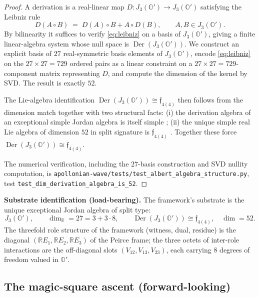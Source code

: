 \documentclass[11pt,a4paper]{article}
\theoremstyle{plain}
\theoremstyle{definition}
\theoremstyle{remark}
\numberwithin{equation}{section}
\providecommand{\R}{\mathbb{R}}
\providecommand{\Os}{\mathbb{O}'}
\providecommand{\fk}[1]{\mathfrak{#1}}
\DeclareMathOperator{\Der}{Der}
\begin{document}
\begin{proof}
A derivation is a real-linear map $D: J_3(\Os) \to J_3(\Os)$
satisfying the Leibniz rule
\begin{equation}
  D(A \circ B) \;=\; D(A) \circ B + A \circ D(B), \qquad A, B \in J_3(\Os).
  \label{eq:leibniz}
\end{equation}
By bilinearity it suffices to verify \eqref{eq:leibniz} on a basis
of $J_3(\Os)$, giving a finite linear-algebra system whose null
space is $\Der(J_3(\Os))$.  We construct an explicit basis of $27$
real-symmetric basis elements of $J_3(\Os)$, encode
\eqref{eq:leibniz} on the $27 \times 27 = 729$ ordered pairs as a
linear constraint on a $27 \times 27 = 729$-component matrix
representing $D$, and compute the dimension of the kernel by
SVD.  The result is exactly $52$.

\smallskip
The Lie-algebra identification $\Der(J_3(\Os)) \cong
\fk{f}_{4(4)}$ then follows from the dimension match together with
two structural facts: (i) the derivation algebra of an
exceptional simple Jordan algebra is itself simple
\cite{jacobson1968}; (ii) the unique simple real Lie algebra of
dimension $52$ in split signature is $\fk{f}_{4(4)}$
\cite{cartan1894,helgason2001}.  Together these force
$\Der(J_3(\Os)) \cong \fk{f}_{4(4)}$.

\smallskip
The numerical verification, including the $27$-basis construction
and SVD nullity computation, is
\texttt{apollonian-wave/tests/test\_albert\_algebra\_structure.py},
test \texttt{test\_dim\_derivation\_algebra\_is\_52}.
\end{proof}

\begin{keyresultbox}
\noindent\textbf{Substrate identification (load-bearing).}
The framework's substrate is the unique exceptional Jordan algebra
of split type:
\[
  J_3(\Os), \qquad
  \dim_\R = 27 = 3 + 3 \cdot 8, \qquad
  \Der(J_3(\Os)) \cong \fk{f}_{4(4)}, \quad
  \dim = 52.
\]
The threefold role structure of the framework (witness, dual,
residue) is the diagonal $(\R E_1, \R E_2, \R E_3)$ of the Peirce
frame; the three octets of inter-role interactions are the
off-diagonal slots $(V_{12}, V_{13}, V_{23})$, each carrying $8$
degrees of freedom valued in $\Os$.
\end{keyresultbox}

\subsection{The magic-square ascent (forward-looking)}
\end{document}
